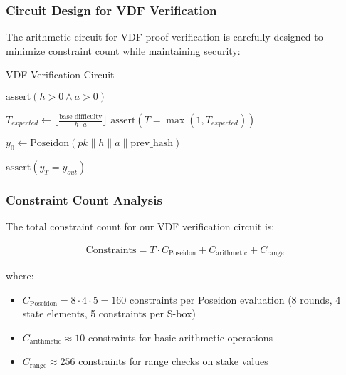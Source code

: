 \documentclass[11pt,a4paper]{article}
\begin{document}
\subsubsection{Circuit Design for VDF Verification}

The arithmetic circuit for VDF proof verification is carefully designed to minimize constraint count while maintaining security:

\begin{algorithm}[H]
\SetAlgoLined
{}
\caption{VDF Verification Circuit}

$\text{assert}(h > 0 \land a > 0)$\;

$T_{expected} \leftarrow \lfloor \frac{\text{base\_difficulty}}{h \cdot a} \rfloor$\;
$\text{assert}(T = \max(1, T_{expected}))$\;

$y_0 \leftarrow \text{Poseidon}(pk \| h \| a \| \text{prev\_hash})$\;

$\text{assert}(y_T = y_{out})$\;

\;
\end{algorithm}

\subsubsection{Constraint Count Analysis}

The total constraint count for our VDF verification circuit is:

\begin{align}
\text{Constraints} = T \cdot C_{\text{Poseidon}} + C_{\text{arithmetic}} + C_{\text{range}}
\end{align}

where:
\begin{itemize}
\item $C_{\text{Poseidon}} = 8 \cdot 4 \cdot 5 = 160$ constraints per Poseidon evaluation (8 rounds, 4 state elements, 5 constraints per S-box)
\item $C_{\text{arithmetic}} \approx 10$ constraints for basic arithmetic operations
\item $C_{\text{range}} \approx 256$ constraints for range checks on stake values
\end{itemize}
\end{document}
